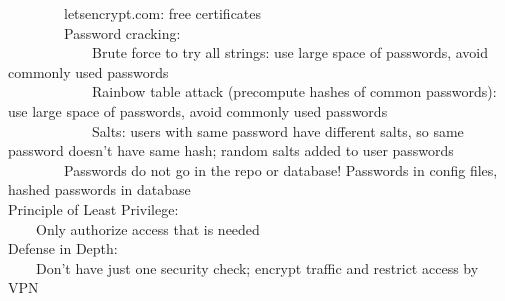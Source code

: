 \documentclass[10pt,letterpaper,unboxed,cm]{article}
\newcommand{\tab}{~~~~}
\begin{document}
\tab \tab letsencrypt.com: free certificates\\
\tab \tab Password cracking: \\
\tab \tab \tab Brute force to try all strings: use large space of passwords, avoid commonly used passwords\\
\tab \tab \tab Rainbow table attack (precompute hashes of common passwords): use large space of passwords, avoid commonly used passwords\\ 
\tab \tab \tab Salts: users with same password have different salts, so same password doesn't have same hash; random salts added to user passwords\\
\tab \tab Passwords do not go in the repo or database! Passwords in config files, hashed passwords in database\\
Principle of Least Privilege: \\
\tab Only authorize access that is needed\\
Defense in Depth: \\
\tab Don't have just one security check; encrypt traffic and restrict access by VPN\\
\end{document}
